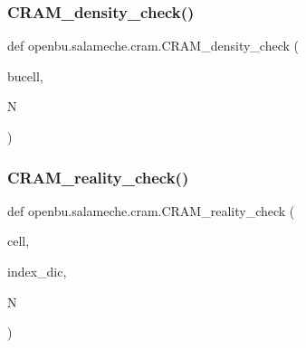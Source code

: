 \subsubsection{\texorpdfstring{C\+R\+A\+M\+\_\+density\+\_\+check()}{CRAM\_density\_check()}}
{\footnotesize\ttfamily def openbu.\+salameche.\+cram.\+C\+R\+A\+M\+\_\+density\+\_\+check (\begin{DoxyParamCaption}\item[{}]{bucell,  }\item[{}]{N }\end{DoxyParamCaption})}

\mbox{\label{namespaceopenbu_1_1salameche_1_1cram_abbca17e75b442aba54c5e19e23b82473}} 
\subsubsection{\texorpdfstring{C\+R\+A\+M\+\_\+reality\+\_\+check()}{CRAM\_reality\_check()}}
{\footnotesize\ttfamily def openbu.\+salameche.\+cram.\+C\+R\+A\+M\+\_\+reality\+\_\+check (\begin{DoxyParamCaption}\item[{}]{cell,  }\item[{}]{index\+\_\+dic,  }\item[{}]{N }\end{DoxyParamCaption})}

